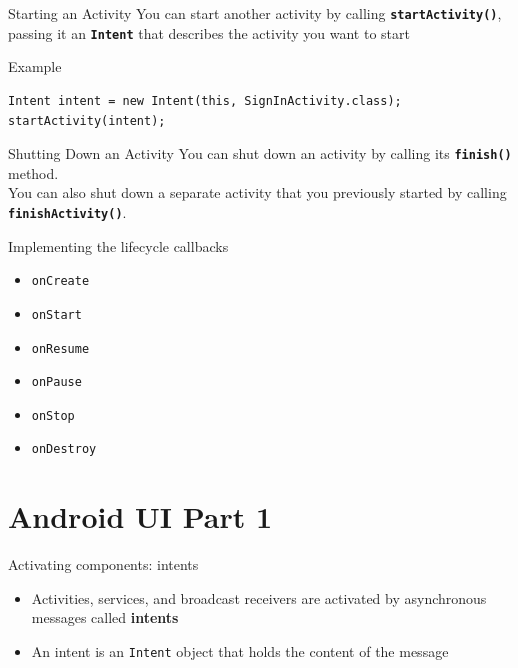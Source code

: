 \begin{frame}[fragile]{Starting an Activity}
You can start another activity by calling \textbf{\texttt{startActivity()}}, passing it an 
\textbf{\texttt{Intent}} that describes the activity you want to start
\begin{exampleblock}{Example}
\begin{lstlisting}
Intent intent = new Intent(this, SignInActivity.class);
startActivity(intent);
\end{lstlisting}
\end{exampleblock}
\end{frame}


\begin{frame}{Shutting Down an Activity}
You can shut down an activity by calling its \textbf{\texttt{finish()}} method.
\\\vfill
You can also shut down a separate activity that you previously started by
calling \textbf{\texttt{finishActivity()}}.
\end{frame}

\begin{frame}{Implementing the lifecycle callbacks}
\begin{itemize}
  \item \texttt{onCreate}
  \item \texttt{onStart}
  \item \texttt{onResume}
  \item \texttt{onPause}
  \item \texttt{onStop}
  \item \texttt{onDestroy}
\end{itemize}
\end{frame}

\section{Android UI Part 1}
\begin{frame}{Activating components: intents}
\begin{itemize}
  \item Activities, services, and broadcast receivers are activated by
  asynchronous messages called \textbf{intents}
  \item An intent is an \texttt{Intent} object that holds the content of the
  message
\end{itemize}
\end{frame}

